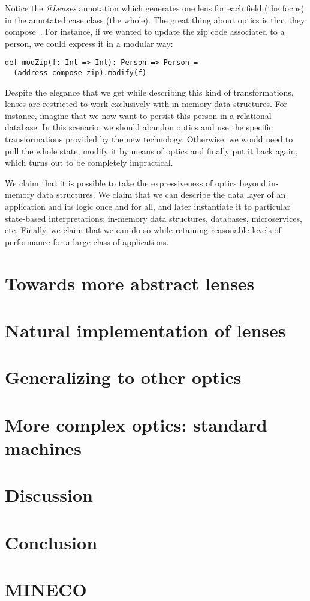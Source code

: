\documentclass[final, twocolumn, 3p]{elsarticle}
\begin{document}
Notice the \emph{@Lenses} annotation which generates one lens for each field
(the focus) in the annotated case class (the whole). The great thing about
optics is that they compose~\cite{pickering2017profunctor}. For instance, if we
wanted to update the zip code associated to a person, we could express it in a
modular way:

\begin{lstlisting}
def modZip(f: Int => Int): Person => Person =
  (address compose zip).modify(f)
\end{lstlisting}

Despite the elegance that we get while describing this kind of transformations,
lenses are restricted to work exclusively with in-memory data structures. For
instance, imagine that we now want to persist this person in a relational
database. In this scenario, we should abandon optics and use the specific
transformations provided by the new technology. Otherwise, we would need to pull
the whole state, modify it by means of optics and finally put it back again,
which turns out to be completely impractical.

We claim that it is possible to take the expressiveness of optics beyond
in-memory data structures. We claim that we can describe the data layer of an
application and its logic once and for all, and later instantiate it to
particular state-based interpretations: in-memory data structures, databases,
microservices, etc. Finally, we claim that we can do so while retaining
reasonable levels of performance for a large class of applications.


\section{Towards more abstract lenses}

\section{Natural implementation of lenses}

\section{Generalizing to other optics}

\section{More complex optics: standard machines}

\section{Discussion}

\section{Conclusion}

\section{MINECO}

{}

\end{document}
